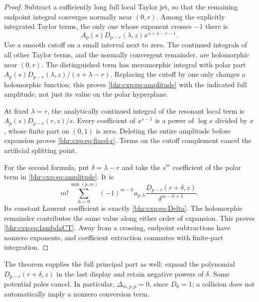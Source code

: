 \documentclass[11pt]{article}
\numberwithin{equation}{section}
\theoremstyle{plain}
\theoremstyle{definition}
\theoremstyle{remark}
\begin{document}
\begin{proof}
Subtract a sufficiently long full local Taylor jet, so that the
remaining endpoint integral converges normally near \((0,r)\).
Among the explicitly integrated Taylor terms, the only one whose
exponent crosses \(-1\) there is
\[
 A_p(s)D_{p-r}(\lambda,z)
                 x^{s+\lambda-r-1}.
\]
Use a smooth cutoff on a small interval next to zero.
The continued integrals of all other Taylor terms, and the normally
convergent remainder, are holomorphic near \((0,r)\).
The distinguished term has meromorphic integral with polar part
\(A_p(s)D_{p-r}(\lambda,z)/(s+\lambda-r)\).
Replacing the cutoff by one only changes a holomorphic function;
this proves \eqref{bhr:cxp:eq:amplitude} with the indicated full
amplitude, not just its value on the polar hyperplane.

At fixed \(\lambda=r\), the analytically continued integral of
the resonant local term is \(A_p(s)D_{p-r}(r,z)/s\).
Every coefficient of \(x^{s-1}\) is a power of \(\log x\)
divided by \(x\), whose finite part on \((0,1)\) is zero.
Deleting the entire amplitude before expansion proves
\eqref{bhr:cxp:eq:fixed-r}.  Terms on the cutoff complement
cancel the artificial splitting point.

For the second formula, put \(\delta=\lambda-r\) and take
the \(s^m\) coefficient of the polar term in
\eqref{bhr:cxp:eq:amplitude}.  It is
\[
 m!\sum_{h=0}^{\min(p,m)}
  (-1)^{m-h}a_{p,h}
       \frac{D_{p-r}(r+\delta,z)}{\delta^{m-h+1}}.
\]
Its constant Laurent coefficient is exactly
\eqref{bhr:cxp:eq:Delta}.  The holomorphic remainder contributes
the same value along either order of expansion.  This proves
\eqref{bhr:cxp:eq:lambdaCT}.  Away from a crossing, endpoint
subtractions have nonzero exponents, and coefficient extraction
commutes with finite-part integration.
\end{proof}

The theorem supplies the full principal part as well: expand the
polynomial \(D_{p-r}(r+\delta,z)\) in the last display and retain
negative powers of \(\delta\).  Some potential poles cancel.
In particular, \(\Delta_{m,p,p}=0\), since \(D_0=1\);
a collision does not automatically imply a nonzero conversion term.
\end{document}
